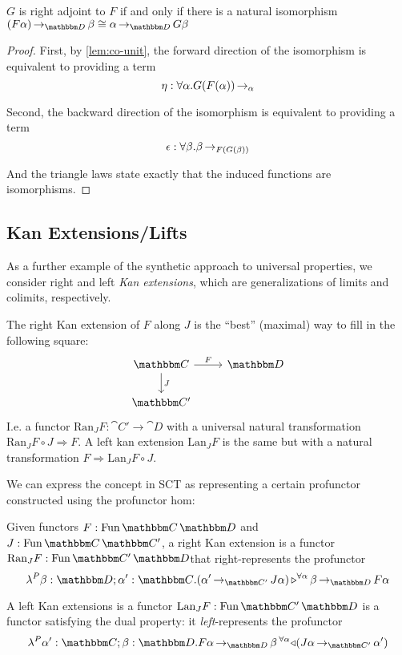 \documentclass{llncs}
\begin{document}
\begin{theorem}[Adjunctions]
  $G$ is right adjoint to $F$ if and only if there is a natural isomorphism
  $\punitinXfromYtoZ {\cat D} {(F \alpha)} \beta \cong \punitinXfromYtoZ {\cat D} \alpha {G \beta}$
\end{theorem}
\begin{proof}
  First, by \cref{lem:co-unit}, the forward direction of the
  isomorphism is equivalent to providing a term
  \[ \eta : \forall \alpha. G(F(\alpha))  \mathop{\to_{\alpha}} \]

  Second, the backward direction of the isomorphism is equivalent to
  providing a term
  \[ \epsilon : \forall \beta. \beta \mathop{\to_{F(G(\beta))}} \]

  And the triangle laws state exactly that the induced functions are
  isomorphisms.
\end{proof}

\subsection{Kan Extensions/Lifts}

As a further example of the synthetic approach to universal
properties, we consider right and left \emph{Kan extensions}, which
are generalizations of limits and colimits, respectively.

The right Kan extension of $F$ along $J$ is the ``best'' (maximal) way to
fill in the following square:
\[%
\begin{tikzcd}
\cat C \arrow[d, "J"] \arrow[r, "F"] & \cat D \\
\cat C'                              &  
\end{tikzcd}\]
I.e. a functor $\textrm{Ran}_J F : \cat C' \to \cat D$ with a
universal natural transformation $\textrm{Ran}_J F \circ J \Rightarrow
F$. A left kan extension $\textrm{Lan}_J F$ is the same but with a
natural transformation $F \Rightarrow \textrm{Lan}_J F \circ J $.

We can express the concept in SCT as representing a certain profunctor
constructed using the profunctor hom:
\begin{definition}
  Given functors $F : \varr {\cat C}{\cat D}$ and $J : \varr {\cat
    C}{\cat C'}$, a right Kan extension is a functor $\textrm{Ran}_J F
  : \varr {\cat C'}{\cat D} $that right-represents the profunctor
  \[ \hlambda {\beta:\cat D}{\alpha': \cat C} \homrallXYtoZ {\alpha}{(\punitinXfromYtoZ {\cat C'}{\alpha'}{J\alpha})} {\punitinXfromYtoZ {\cat D}{\beta}{F \alpha}} \]

  A left Kan extensions is a functor $\textrm{Lan}_J F : \varr {\cat
    C'}{\cat D}$ is a functor satisfying the dual property: it
  \emph{left}-represents the profunctor
  \[\hlambda {\alpha':\cat C}{\beta:\cat D} \homlallXYtoZ {\alpha}{(\punitinXfromYtoZ {\cat C'}{J\alpha}{\alpha'})} {\punitinXfromYtoZ {\cat D}{F \alpha}{\beta}}
  \]
\end{definition}
\end{document}
